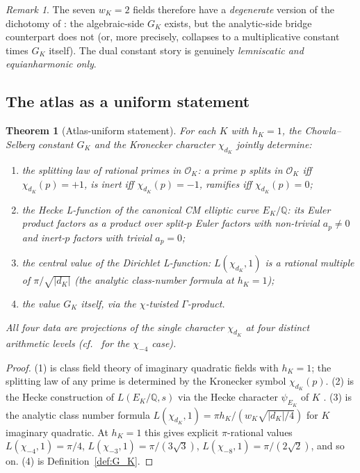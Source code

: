 \documentclass[11pt]{amsart}
\theoremstyle{plain}
\newtheorem{theorem}{Theorem}[section]
\theoremstyle{definition}
\theoremstyle{remark}
\newtheorem*{remark}{Remark}
\newcommand{\GK}{G_{K}}
\newcommand{\Q}{\mathbb{Q}}
\begin{document}
\begin{remark}
The seven $w_K = 2$ fields therefore have a \emph{degenerate} version of
the dichotomy of \cite{paper-gstar-A}: the algebraic-side $\GK$ exists,
but the analytic-side bridge counterpart does not (or, more precisely,
collapses to a multiplicative constant times $\GK$ itself). The dual
constant story is genuinely \emph{lemniscatic and equianharmonic only}.
\end{remark}

\subsection{The atlas as a uniform statement}

\begin{theorem}[Atlas-uniform statement]\label{thm:atlas-uniform}
For each $K$ with $h_K = 1$, the Chowla--Selberg constant $\GK$ and the
Kronecker character $\chi_{d_K}$ jointly determine:
\begin{enumerate}[label=\textup{(\arabic*)}, leftmargin=*, itemsep=2pt]
\item the splitting law of rational primes in $\mathcal{O}_K$: a prime $p$
splits in $\mathcal{O}_K$ iff $\chi_{d_K}(p) = +1$, is inert iff
$\chi_{d_K}(p) = -1$, ramifies iff $\chi_{d_K}(p) = 0$;
\item the Hecke L-function of the canonical CM elliptic curve $E_K/\Q$:
its Euler product factors as a product over split-$p$ Euler factors with
non-trivial $a_p \neq 0$ and inert-$p$ factors with trivial $a_p = 0$;
\item the central value of the Dirichlet L-function:
$L(\chi_{d_K}, 1)$ is a rational multiple of $\pi/\sqrt{|d_K|}$ (the
analytic class-number formula at $h_K = 1$);
\item the value $\GK$ itself, via the $\chi$-twisted $\Gamma$-product.
\end{enumerate}
All four data are projections of the single character $\chi_{d_K}$ at
four distinct arithmetic levels (cf.\ \cite[\S 16]{paper-gstar-A} for the
$\chi_{-4}$ case).
\end{theorem}

\begin{proof}
(1) is class field theory of imaginary quadratic fields with $h_K = 1$;
the splitting law of any prime is determined by the Kronecker symbol
$\chi_{d_K}(p)$. (2) is the Hecke construction of $L(E_K/\Q, s)$ via the
Hecke character $\psi_{E_K}$ of $K$ \cite[\S{}II]{silverman-arithmetic}.
(3) is the analytic class number formula
$L(\chi_{d_K}, 1) = \pi h_K / (w_K \sqrt{|d_K|/4})$ for $K$ imaginary
quadratic. At $h_K = 1$ this gives explicit $\pi$-rational values
$L(\chi_{-4}, 1) = \pi/4$, $L(\chi_{-3}, 1) = \pi/(3\sqrt{3})$,
$L(\chi_{-8}, 1) = \pi/(2\sqrt{2})$, and so on. (4) is
Definition~\ref{def:G_K}.
\end{proof}
\end{document}
